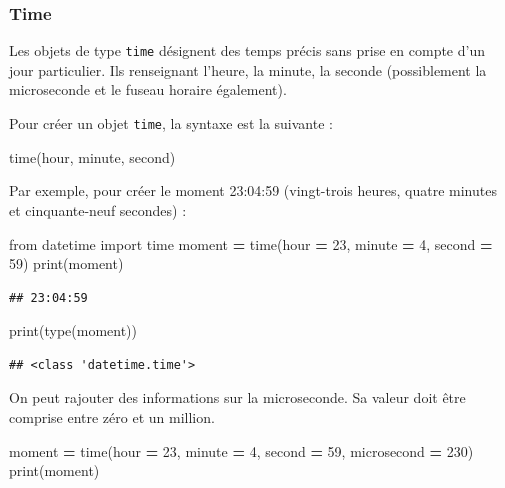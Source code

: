 \documentclass[
  12pt,
]{book}
\newenvironment{Shaded}{\begin{snugshade}}{\end{snugshade}}
\newcommand{\BuiltInTok}[1]{#1}
\newcommand{\DecValTok}[1]{\textcolor[rgb]{0.00,0.00,0.81}{#1}}
\newcommand{\ImportTok}[1]{#1}
\newcommand{\NormalTok}[1]{#1}
\newcommand{\OperatorTok}[1]{\textcolor[rgb]{0.81,0.36,0.00}{\textbf{#1}}}
\numberwithin{equation}{section}
\numberwithin{countremarque}{section}
\begin{document}
\subsubsection{Time}\label{type-time}

Les objets de type \texttt{time} désignent des temps précis sans prise en compte d'un jour particulier. Ils renseignant l'heure, la minute, la seconde (possiblement la microseconde et le fuseau horaire également).

Pour créer un objet \texttt{time}, la syntaxe est la suivante :

\begin{Shaded}
\begin{Highlighting}[]
\NormalTok{time(hour, minute, second)}
\end{Highlighting}
\end{Shaded}

Par exemple, pour créer le moment 23:04:59 (vingt-trois heures, quatre minutes et cinquante-neuf secondes) :

\begin{Shaded}
\begin{Highlighting}[]
\ImportTok{from}\NormalTok{ datetime }\ImportTok{import}\NormalTok{ time}
\NormalTok{moment }\OperatorTok{=}\NormalTok{ time(hour }\OperatorTok{=} \DecValTok{23}\NormalTok{, minute }\OperatorTok{=} \DecValTok{4}\NormalTok{, second }\OperatorTok{=} \DecValTok{59}\NormalTok{)}
\BuiltInTok{print}\NormalTok{(moment)}
\end{Highlighting}
\end{Shaded}

\begin{lstlisting}
## 23:04:59
\end{lstlisting}

\begin{Shaded}
\begin{Highlighting}[]
\BuiltInTok{print}\NormalTok{(}\BuiltInTok{type}\NormalTok{(moment))}
\end{Highlighting}
\end{Shaded}

\begin{lstlisting}
## <class 'datetime.time'>
\end{lstlisting}

On peut rajouter des informations sur la microseconde. Sa valeur doit être comprise entre zéro et un million.

\begin{Shaded}
\begin{Highlighting}[]
\NormalTok{moment }\OperatorTok{=}\NormalTok{ time(hour }\OperatorTok{=} \DecValTok{23}\NormalTok{, minute }\OperatorTok{=} \DecValTok{4}\NormalTok{, second }\OperatorTok{=} \DecValTok{59}\NormalTok{, microsecond }\OperatorTok{=} \DecValTok{230}\NormalTok{)}
\BuiltInTok{print}\NormalTok{(moment)}
\end{Highlighting}
\end{Shaded}
\end{document}
